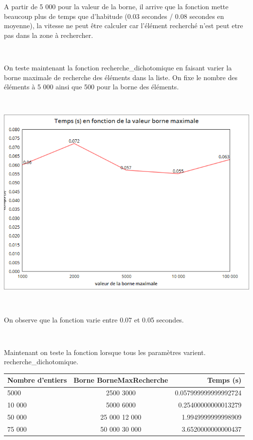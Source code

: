 \documentclass[a4paper, 12pt]{article}
\begin{document}
A partir de 5 000 pour la valeur de la borne, il arrive que la fonction mette beaucoup plus de temps que d'habitude (0.03 secondes / 0.08 secondes en moyenne), la vitesse ne peut être calculer car l'élément recherché n'est peut etre pas dans la zone à rechercher.

~

On teste maintenant la fonction recherche\_dichotomique en faisant varier la borne maximale de recherche des éléments dans la liste. On fixe le nombre des éléments à 5 000 ainsi que 500 pour la borne des éléments.

~
\begin{center}
\includegraphics[scale=0.25]{recherchedichoBMAX.png}
\end{center}
~

On observe que la fonction varie entre 0.07 et 0.05 secondes.

~

Maintenant on teste la fonction lorsque tous les paramètres varient. recherche\_dichotomique.


\begin{table}[htbp]
  \centering
  \begin{tabular}{||l|c|r||}\hline
    \textbf{Nombre d'entiers} & \textbf{Borne BorneMaxRecherche} & \textbf{Temps (s)}\\\hline\hline
      5000           &  2500  3000      & 0.057999999999992724 \\\hline
    10 000           & 5000  6000       & 0.25400000000013279 \\\hline
    50 000           & 25 000  12 000   & 1.9949999999998909 \\\hline
    75 000          & 50 000  30 000    & 3.6520000000000437   \\\hline
  \end{tabular}
  \label{tablerechdich}
\end{table}
\end{document}
